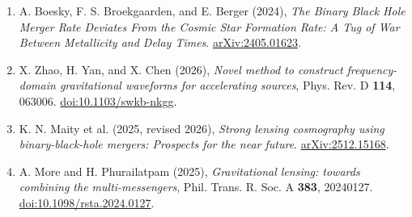 \documentclass[11pt]{article}
\begin{document}
\begin{enumerate}[itemsep=7pt]
\item A. Boesky, F. S. Broekgaarden, and E. Berger (2024), \textit{The Binary Black Hole Merger Rate Deviates From the Cosmic Star Formation Rate: A Tug of War Between Metallicity and Delay Times}. \href{https://arxiv.org/abs/2405.01623}{arXiv:2405.01623}.
\item X. Zhao, H. Yan, and X. Chen (2026), \textit{Novel method to construct frequency-domain gravitational waveforms for accelerating sources}, Phys. Rev. D \textbf{114}, 063006. \href{https://doi.org/10.1103/swkb-nkgg}{doi:10.1103/swkb-nkgg}.
\item K. N. Maity et al. (2025, revised 2026), \textit{Strong lensing cosmography using binary-black-hole mergers: Prospects for the near future}. \href{https://arxiv.org/abs/2512.15168}{arXiv:2512.15168}.
\item A. More and H. Phurailatpam (2025), \textit{Gravitational lensing: towards combining the multi-messengers}, Phil. Trans. R. Soc. A \textbf{383}, 20240127. \href{https://doi.org/10.1098/rsta.2024.0127}{doi:10.1098/rsta.2024.0127}.
\end{enumerate}
\end{document}
